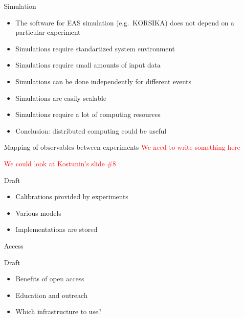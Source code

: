 \documentclass[18pt]{beamer}
\newcommand{\itemarrow}{\scriptsize\raise1.25pt\hbox{\textcolor{kit-green100}{$\blacktriangleright$}}}
\newcommand{\concl}[1]{\item[\itemarrow]\textcolor{kit-green100}{#1}}
\begin{document}
\begin{frame}{Simulation}
\begin{itemize}
  \item The software for EAS simulation (e.g.\ KORSIKA) does not depend on a particular experiment
  \concl{Simulations require standartized system environment}
  \item Simulations require small amounts of input data
  \item Simulations can be done independently for different events
  \concl{Simulations are easily scalable}
  \item Simulations require a lot of computing resources
  \concl{Conclusion: distributed computing could be useful}
\end{itemize}
\end{frame}

\begin{frame}{Mapping of observables between experiments}
\textcolor{red}{We need to write something here}

\textcolor{red}{We could look at Kostunin's slide \#8}

\begin{block}{Draft}
  \begin{itemize}
    \item Calibrations provided by experiments
    \item Various models
    \item Implementations are stored
  \end{itemize}
\end{block}
\end{frame}

\begin{frame}{Access}
\begin{block}{Draft}
  \begin{itemize}
    \item Benefits of open access
    \item Education and outreach
    \item Which infrastructure to use?
  \end{itemize}
\end{block}
\end{frame}
\end{document}
